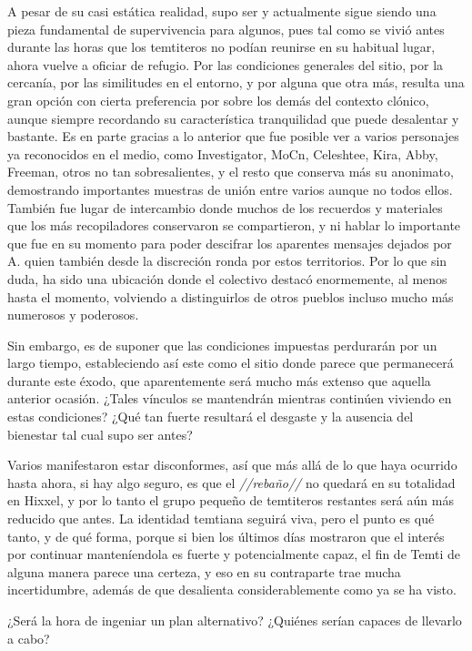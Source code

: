 \documentclass[
  spanish,
]{book}
\begin{document}
A pesar de su casi estática realidad, supo ser y actualmente sigue siendo una pieza fundamental de supervivencia para algunos, pues tal como se vivió antes durante las horas que los temtiteros no podían reunirse en su habitual lugar, ahora vuelve a oficiar de refugio. Por las condiciones generales del sitio, por la cercanía, por las similitudes en el entorno, y por alguna que otra más, resulta una gran opción con cierta preferencia por sobre los demás del contexto clónico, aunque siempre recordando su característica tranquilidad que puede desalentar y bastante.
Es en parte gracias a lo anterior que fue posible ver a varios personajes ya reconocidos en el medio, como Investigator, MoCn, Celeshtee, Kira, Abby, Freeman, otros no tan sobresalientes, y el resto que conserva más su anonimato, demostrando importantes muestras de unión entre varios aunque no todos ellos. También fue lugar de intercambio donde muchos de los recuerdos y materiales que los más recopiladores conservaron se compartieron, y ni hablar lo importante que fue en su momento para poder descifrar los aparentes mensajes dejados por A. quien también desde la discreción ronda por estos territorios. Por lo que sin duda, ha sido una ubicación donde el colectivo destacó enormemente, al menos hasta el momento, volviendo a distinguirlos de otros pueblos incluso mucho más numerosos y poderosos.

Sin embargo, es de suponer que las condiciones impuestas perdurarán por un largo tiempo, estableciendo así este como el sitio donde parece que permanecerá durante este éxodo, que aparentemente será mucho más extenso que aquella anterior ocasión. ¿Tales vínculos se mantendrán mientras continúen viviendo en estas condiciones? ¿Qué tan fuerte resultará el desgaste y la ausencia del bienestar tal cual supo ser antes?

Varios manifestaron estar disconformes, así que más allá de lo que haya ocurrido hasta ahora, si hay algo seguro, es que el \emph{//rebaño//} no quedará en su totalidad en Hixxel, y por lo tanto el grupo pequeño de temtiteros restantes será aún más reducido que antes. La identidad temtiana seguirá viva, pero el punto es qué tanto, y de qué forma, porque si bien los últimos días mostraron que el interés por continuar manteníendola es fuerte y potencialmente capaz, el fin de Temti de alguna manera parece una certeza, y eso en su contraparte trae mucha incertidumbre, además de que desalienta considerablemente como ya se ha visto.

¿Será la hora de ingeniar un plan alternativo? ¿Quiénes serían capaces de llevarlo a cabo?
\end{document}
